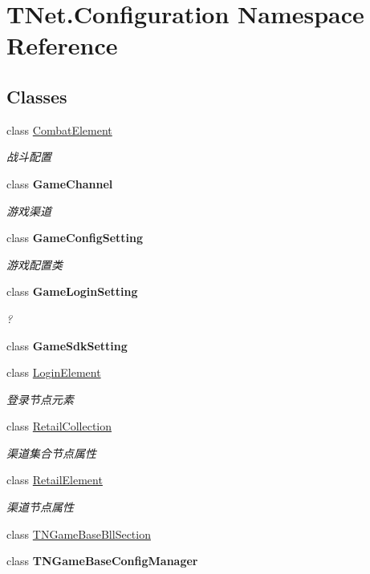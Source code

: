 \hypertarget{namespace_t_net_1_1_configuration}{}\section{T\+Net.\+Configuration Namespace Reference}
\label{namespace_t_net_1_1_configuration}
\subsection*{Classes}
\begin{DoxyCompactItemize}
\item 
class \mbox{\hyperlink{class_t_net_1_1_configuration_1_1_combat_element}{Combat\+Element}}
\begin{DoxyCompactList}\small\item\em 战斗配置 \end{DoxyCompactList}\item 
class {\bfseries Game\+Channel}
\begin{DoxyCompactList}\small\item\em 游戏渠道 \end{DoxyCompactList}\item 
class {\bfseries Game\+Config\+Setting}
\begin{DoxyCompactList}\small\item\em 游戏配置类 \end{DoxyCompactList}\item 
class {\bfseries Game\+Login\+Setting}
\begin{DoxyCompactList}\small\item\em ? \end{DoxyCompactList}\item 
class {\bfseries Game\+Sdk\+Setting}
\item 
class \mbox{\hyperlink{class_t_net_1_1_configuration_1_1_login_element}{Login\+Element}}
\begin{DoxyCompactList}\small\item\em 登录节点元素 \end{DoxyCompactList}\item 
class \mbox{\hyperlink{class_t_net_1_1_configuration_1_1_retail_collection}{Retail\+Collection}}
\begin{DoxyCompactList}\small\item\em 渠道集合节点属性 \end{DoxyCompactList}\item 
class \mbox{\hyperlink{class_t_net_1_1_configuration_1_1_retail_element}{Retail\+Element}}
\begin{DoxyCompactList}\small\item\em 渠道节点属性 \end{DoxyCompactList}\item 
class \mbox{\hyperlink{class_t_net_1_1_configuration_1_1_t_n_game_base_bll_section}{T\+N\+Game\+Base\+Bll\+Section}}
\item 
class {\bfseries T\+N\+Game\+Base\+Config\+Manager}
\end{DoxyCompactItemize}

